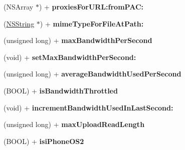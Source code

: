 \begin{DoxyCompactItemize}
\item 
\hypertarget{interface_a_s_i_h_t_t_p_request_ab01db21bf0f7a061dd03837561dc0b4d}{
(NSArray $\ast$) + {\bfseries proxiesForURL:fromPAC:}}
\label{interface_a_s_i_h_t_t_p_request_ab01db21bf0f7a061dd03837561dc0b4d}

\item 
\hypertarget{interface_a_s_i_h_t_t_p_request_af0ff90cbf5e2f4e4b4dc1a7a801dc390}{
(\hyperlink{class_n_s_string}{NSString} $\ast$) + {\bfseries mimeTypeForFileAtPath:}}
\label{interface_a_s_i_h_t_t_p_request_af0ff90cbf5e2f4e4b4dc1a7a801dc390}

\item 
\hypertarget{interface_a_s_i_h_t_t_p_request_adbca39932d3860a615003ce57722e134}{
(unsigned long) + {\bfseries maxBandwidthPerSecond}}
\label{interface_a_s_i_h_t_t_p_request_adbca39932d3860a615003ce57722e134}

\item 
\hypertarget{interface_a_s_i_h_t_t_p_request_a42d27a50f0bcf03563e1c7b8ac8bfd7d}{
(void) + {\bfseries setMaxBandwidthPerSecond:}}
\label{interface_a_s_i_h_t_t_p_request_a42d27a50f0bcf03563e1c7b8ac8bfd7d}

\item 
\hypertarget{interface_a_s_i_h_t_t_p_request_ae3c70bd7067b067d3e26e846dd776207}{
(unsigned long) + {\bfseries averageBandwidthUsedPerSecond}}
\label{interface_a_s_i_h_t_t_p_request_ae3c70bd7067b067d3e26e846dd776207}

\item 
\hypertarget{interface_a_s_i_h_t_t_p_request_a491d9c50c9e9f3a14a04589182df4ea8}{
(BOOL) + {\bfseries isBandwidthThrottled}}
\label{interface_a_s_i_h_t_t_p_request_a491d9c50c9e9f3a14a04589182df4ea8}

\item 
\hypertarget{interface_a_s_i_h_t_t_p_request_a0dd9a55c94f4d564a49799a7cfca9cdc}{
(void) + {\bfseries incrementBandwidthUsedInLastSecond:}}
\label{interface_a_s_i_h_t_t_p_request_a0dd9a55c94f4d564a49799a7cfca9cdc}

\item 
\hypertarget{interface_a_s_i_h_t_t_p_request_a0a96f075234703cd98779f82460122f2}{
(unsigned long) + {\bfseries maxUploadReadLength}}
\label{interface_a_s_i_h_t_t_p_request_a0a96f075234703cd98779f82460122f2}

\item 
\hypertarget{interface_a_s_i_h_t_t_p_request_a6a734f775a6b3584082cbcaa779ab831}{
(BOOL) + {\bfseries isiPhoneOS2}}
\label{interface_a_s_i_h_t_t_p_request_a6a734f775a6b3584082cbcaa779ab831}


\end{DoxyCompactItemize}
